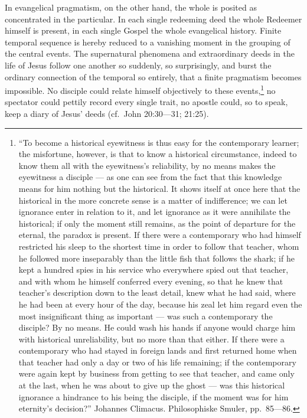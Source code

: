 \documentclass[12pt,a4paper]{book}
\begin{document}
In evangelical pragmatism, on the other hand, the whole is posited as concentrated in the
particular. In each single redeeming deed the whole Redeemer himself is present, in each
single Gospel the whole evangelical history. Finite temporal sequence is hereby reduced to a
vanishing moment in the grouping of the central events. The supernatural phenomena and
extraordinary deeds in the life of Jesus follow one another so suddenly, so surprisingly,
and burst the ordinary connection of the temporal so entirely, that a finite pragmatism
becomes impossible. No disciple could relate himself objectively to these
events,\footnote{``To become a historical eyewitness is thus easy for the contemporary
learner; the misfortune, however, is that to know a historical circumstance, indeed to know
them all with the eyewitness's reliability, by no means makes the eyewitness a disciple ---
as one can see from the fact that this knowledge means for him nothing but the historical. It
shows itself at once here that the historical in the more concrete sense is a matter of
indifference; we can let ignorance enter in relation to it, and let ignorance as it were
annihilate the historical; if only the moment still remains, as the point of departure for
the eternal, the paradox is present. If there were a contemporary who had himself restricted
his sleep to the shortest time in order to follow that teacher, whom he followed more
inseparably than the little fish that follows the shark; if he kept a hundred spies in his
service who everywhere spied out that teacher, and with whom he himself conferred every
evening, so that he knew that teacher's description down to the least detail, knew what he
had said, where he had been at every hour of the day, because his zeal let him regard even
the most insignificant thing as important --- was such a contemporary the disciple? By no
means. He could wash his hands if anyone would charge him with historical unreliability, but
no more than that either. If there were a contemporary who had stayed in foreign lands and
first returned home when that teacher had only a day or two of his life remaining; if the
contemporary were again kept by business from getting to see that teacher, and came only at
the last, when he was about to give up the ghost --- was this historical ignorance a
hindrance to his being the disciple, if the moment was for him eternity's decision?'' Johannes
Climacus. Philosophiske Smuler, pp.\ 85---86.} no spectator could pettily record every single
trait,
no apostle could, so to speak, keep a diary of Jesus' deeds (cf.\ John 20:30---31; 21:25).
\end{document}
